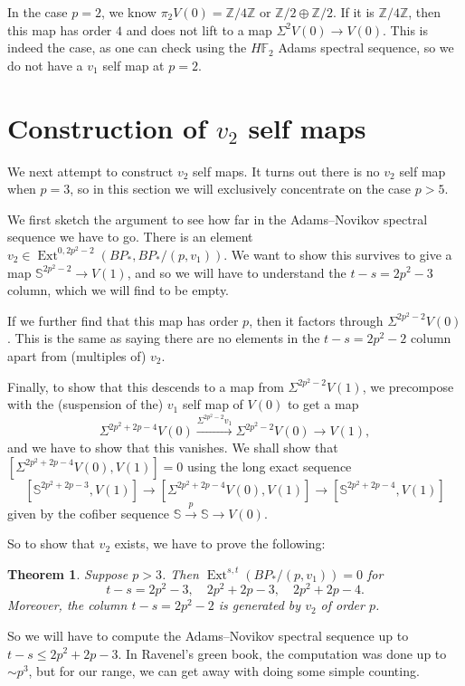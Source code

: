 \documentclass{shortart}
\newtheorem*{thm}{Theorem}
\theoremstyle{definition}
\newcommand\F{\mathbb{F}}
\newcommand\Z{\mathbb{Z}}
\renewcommand\S{\mathbb{S}}
\DeclareMathOperator\Ext{Ext}
\begin{document}
In the case $p = 2$, we know $\pi_2 V(0) = \Z/4\Z$ or $\Z/2 \oplus \Z/2$. If it is $\Z/4\Z$, then this map has order $4$ and does not lift to a map $\Sigma^2 V(0) \to V(0)$. This is indeed the case, as one can check using the $H\F_2$ Adams spectral sequence, so we do not have a $v_1$ self map at $p = 2$.

\section{Construction of \texorpdfstring{$v_2$}{v2} self maps}
We next attempt to construct $v_2$ self maps. It turns out there is no $v_2$ self map when $p = 3$, so in this section we will exclusively concentrate on the case $p > 5$.

We first sketch the argument to see how far in the Adams--Novikov spectral sequence we have to go. There is an element $v_2 \in \Ext^{0, 2p^2 - 2}(BP_*, BP_*/(p, v_1))$. We want to show this survives to give a map $\S^{2p^2 - 2} \to V(1)$, and so we will have to understand the $t - s = 2p^2 - 3$ column, which we will find to be empty.

If we further find that this map has order $p$, then it factors through $\Sigma^{2p^2 - 2} V(0)$. This is the same as saying there are no elements in the $t - s = 2p^2 - 2$ column apart from (multiples of) $v_2$.

Finally, to show that this descends to a map from $\Sigma^{2p^2 - 2} V(1)$, we precompose with the (suspension of the) $v_1$ self map of $V(0)$ to get a map
\[
  \Sigma^{2p^2 + 2p - 4} V(0) \overset{\Sigma^{2p^2 - 2} v_1}{\longrightarrow} \Sigma^{2p^2 - 2} V(0) \longrightarrow V(1),
\]
and we have to show that this vanishes. We shall show that $[\Sigma^{2p^2 + 2p - 4} V(0), V(1)] = 0$ using the long exact sequence
\[
  [\S^{2p^2 + 2p - 3}, V(1)] \to [\Sigma^{2p^2 + 2p - 4} V(0), V(1)] \to [\S^{2p^2 + 2p - 4}, V(1)]
\]
given by the cofiber sequence $\S \overset{p}{\rightarrow} \S \rightarrow V(0)$.

So to show that $v_2$ exists, we have to prove the following:
\begin{thm}
  Suppose $p > 3$. Then $\Ext^{s, t}(BP_*/(p, v_1)) = 0$ for
  \[
    t - s = 2p^2 - 3, \quad 2p^2 + 2p - 3,\quad 2p^2 + 2p - 4.
  \]
  Moreover, the column $t - s = 2p^2 - 2$ is generated by $v_2$ of order $p$.
\end{thm}

So we will have to compute the Adams--Novikov spectral sequence up to $t - s \leq 2p^2 + 2p - 3$. In Ravenel's green book, the computation was done up to $\sim p^3$, but for our range, we can get away with doing some simple counting.
\end{document}
